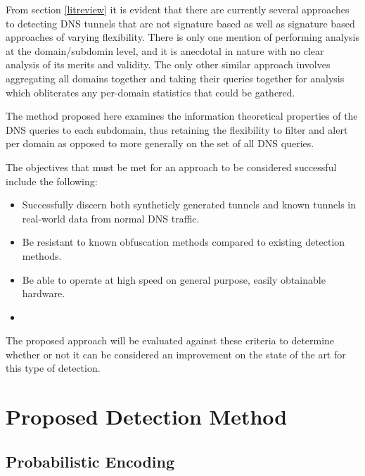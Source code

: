 \documentclass[12pt]{article}
\theoremstyle{remark}
\theoremstyle{definition}
\theoremstyle{definition}
\theoremstyle{definition}
\begin{document}
From section \ref{litreview} it is evident that there are currently several approaches to detecting DNS tunnels that are not signature based as well as signature based approaches of varying flexibility. There is only one mention of performing analysis at the domain/subdomin level, and it is anecdotal in nature with no clear analysis of its merits and validity. The only other similar approach involves aggregating all domains together and taking their queries together for analysis which obliterates any per-domain statistics that could be gathered.

The method proposed here examines the information theoretical properties of the DNS queries to each subdomain, thus retaining the flexibility to filter and alert per domain as opposed to more generally on the set of all DNS queries.

The objectives that must be met for an approach to be considered successful include the following:

\begin{itemize}
\item Successfully discern both syntheticly generated tunnels and known tunnels in real-world data from normal DNS traffic.
\item Be resistant to known obfuscation methods compared to existing detection methods.
\item Be able to operate at high speed on general purpose, easily obtainable hardware.
\item 
\end{itemize}

The proposed approach will be evaluated against these criteria to determine whether or not it can be considered an improvement on the state of the art for this type of detection.

\section{Proposed Detection Method}
\label{datameasurement}

\subsection{Probabilistic Encoding}
\label{probencode}

\newpage
{}

% 
% 
\end{document}
